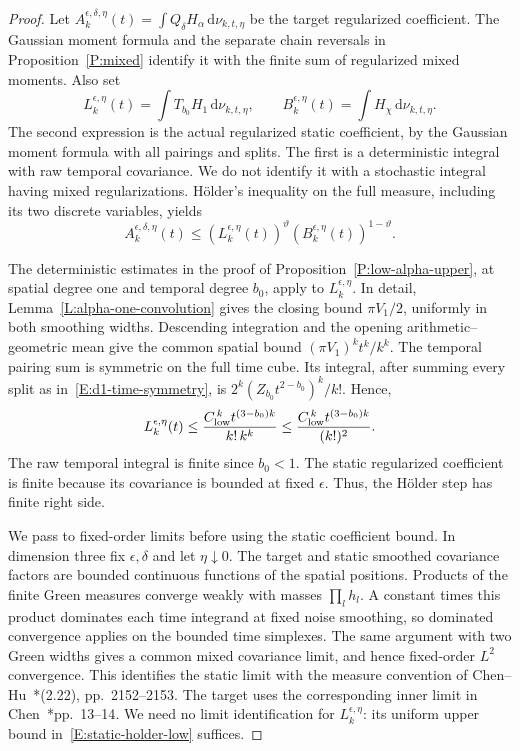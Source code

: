 \documentclass[12pt]{article}
\numberwithin{equation}{section}
\theoremstyle{definition}
\newcommand{\ud}{\,\mathrm{d}}
\begin{document}
\begin{proof}
  Let $A_k^{\epsilon,\delta,\eta}(t)=\int Q_\delta H_\alpha
  \ud\nu_{k,t,\eta}$ be the target regularized coefficient. The
  Gaussian moment formula and the separate chain reversals in
  Proposition~\ref{P:mixed} identify it with the finite sum of
  regularized mixed moments. Also set
  \[
    L_k^{\epsilon,\eta}(t)=\int T_{b_0}H_1\ud\nu_{k,t,\eta},
    \qquad
    B_k^{\epsilon,\eta}(t)=\int H_\chi\ud\nu_{k,t,\eta}.
  \]
  The second expression is the actual regularized static coefficient,
  by the Gaussian moment formula with all pairings and splits. The first
  is a deterministic integral with raw temporal covariance. We do not
  identify it with a stochastic integral having mixed regularizations.
  H\"older's inequality on the full measure, including its two discrete
  variables, yields
  \begin{equation}\label{E:static-holder-regularized}
    A_k^{\epsilon,\delta,\eta}(t)
    \le\left(L_k^{\epsilon,\eta}(t)\right)^\vartheta
    \left(B_k^{\epsilon,\eta}(t)\right)^{1-\vartheta}.
  \end{equation}

  The deterministic estimates in the proof of
  Proposition~\ref{P:low-alpha-upper}, at spatial degree one and
  temporal degree $b_0$, apply to $L_k^{\epsilon,\eta}$.
  In detail, Lemma~\ref{L:alpha-one-convolution} gives the closing
  bound $\pi V_1/2$, uniformly in both smoothing widths. Descending
  integration and the opening arithmetic--geometric mean give the
  common spatial bound $(\pi V_1)^kt^k/k^k$.
  The temporal pairing sum is symmetric on the full time cube. Its
  integral, after summing every split as in~\eqref{E:d1-time-symmetry},
  is $2^k(Z_{b_0}t^{2-b_0})^k/k!$. Hence,
  \begin{equation}\label{E:static-holder-low}
    L_k^{\epsilon,\eta}(t)
    \le\frac{C_{\rm low}^{\,k}t^{(3-b_0)k}}{k!\,k^k}
    \le\frac{C_{\rm low}^{\,k}t^{(3-b_0)k}}{(k!)^2}.
  \end{equation}
  The raw temporal integral is finite since $b_0<1$. The static
  regularized coefficient is finite because its covariance is bounded
  at fixed $\epsilon$. Thus, the H\"older step has finite right side.

  We pass to fixed-order limits before using the static coefficient
  bound. In dimension three fix $\epsilon,\delta$ and let
  $\eta\downarrow0$. The target and static smoothed covariance
  factors are bounded continuous functions of the spatial positions.
  Products of the finite Green measures converge weakly with masses
  $\prod_lh_l$. A constant times this product dominates each time
  integrand at fixed noise smoothing, so dominated convergence applies
  on the bounded time simplexes. The same argument with two Green
  widths gives a common mixed covariance limit, and hence fixed-order
  $L^2$ convergence. This identifies the static limit with
  the measure convention of
  Chen--Hu~\cite{chen.hu:25:hyperbolic}*{(2.22), pp.~2152--2153}.
  The target uses the corresponding inner limit in
  Chen~\cite{chen:author2026:time-dependency}*{pp.~13--14}.
  We need no limit identification for $L_k^{\epsilon,\eta}$:
  its uniform upper bound in~\eqref{E:static-holder-low} suffices.


\end{proof}
\end{document}
